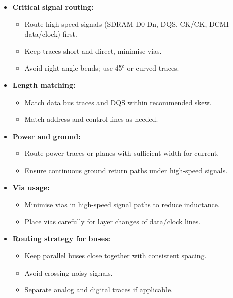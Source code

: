 \documentclass[10pt]{article}
\begin{document}
\begin{itemize}
    \item \textbf{Critical signal routing:}
        \begin{itemize}
            \item Route high-speed signals (SDRAM D0-Dn, DQS, CK/CK, DCMI data/clock) first.
            \item Keep traces short and direct, minimise vias.
            \item Avoid right-angle bends; use 45° or curved traces.
        \end{itemize}

    \item \textbf{Length matching:}
        \begin{itemize}
            \item Match data bus traces and DQS within recommended skew.
            \item Match address and control lines as needed.
        \end{itemize}

    \item \textbf{Power and ground:}
        \begin{itemize}
            \item Route power traces or planes with sufficient width for current.
            \item Ensure continuous ground return paths under high-speed signals.
        \end{itemize}

    \item \textbf{Via usage:}
        \begin{itemize}
            \item Minimise vias in high-speed signal paths to reduce inductance.
            \item Place vias carefully for layer changes of data/clock lines.
        \end{itemize}

    \item \textbf{Routing strategy for buses:}
        \begin{itemize}
            \item Keep parallel buses close together with consistent spacing.
            \item Avoid crossing noisy signals.
            \item Separate analog and digital traces if applicable.
        \end{itemize}
\end{itemize}
\end{document}
